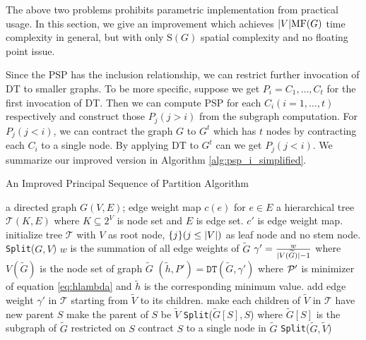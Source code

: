 \documentclass[runningheads]{llncs}
\begin{document}
The above two problems prohibits parametric implementation from practical usage. In this section, we give an improvement which achieves $\abs{V} \textrm{MF}(G)$ time complexity in general, but with only $\textrm{S}(G)$ spatial complexity and no floating point issue.

Since the PSP has the inclusion relationship, we can restrict further invocation of DT to smaller graphs. To be more specific, suppose we get $P_i = {C_1, \dots, C_t}$ for the first invocation of DT. Then we can compute PSP for each $C_i(i=1,\dots, t)$ respectively and construct those $P_j(j>i)$ from the subgraph computation. For $P_j(j<i)$, we can contract the graph $G$  to $G^t$ which has $t$ nodes by contracting each $C_i$ to a single node. By applying DT to $G^t$ can we get $P_j(j<i)$. We summarize our improved version in Algorithm \ref{alg:psp_i_simplified}.

\begin{algorithm}
	\caption{An Improved Principal Sequence of Partition Algorithm}\label{alg:psp_i_simplified}
	\begin{algorithmic}[1]
		\REQUIRE a directed graph $G(V, E)$; edge weight map $c(e)$ for $e\in E$
		\ENSURE a hierarchical tree $\mathcal{T}(K, E)$ where $K \subseteq 2^{V}$ is node set and $E$ is edge set. $c'$ is edge weight map.
		\STATE initialize tree $\mathcal{T}$ with $V$ as root node, $\{j\}(j\leq \abs{V})$ as leaf node and no stem node.
		\STATE \texttt{Split}($G, V$)
		\STATE $w$ is the summation of all edge weights of $\widetilde{G}$ 
		\STATE $\gamma' = \frac{w}{\abs{V(\widetilde{G})}-1}$ where $V(\widetilde{G})$ is the node set of graph $\widetilde{G}$ \label{alg:gamma_apostrophe}
		\STATE $(\tilde{h}, P') = \texttt{DT}(\widetilde{G}, \gamma')$ where $\P'$ is minimizer of equation \eqref{eq:hlambda} and $\tilde{h}$ is the corresponding minimum value.  \label{alg:DT}
		\STATE add edge weight $\gamma'$ in $\mathcal{T}$ starting from $\widetilde{V}$ to its children.
		\ELSE
		\STATE make each children of $\widetilde{V}$ in $\mathcal{T}$ have new parent $S$		
		\STATE make the parent of $S$ be $\widetilde{V}$
		\STATE \texttt{Split}($\widetilde{G}[S], S$) where $\widetilde{G}[S]$ is the subgraph of $\widetilde{G}$ restricted on $S$
		\STATE contract $S$ to a single node in $\widetilde{G}$ %
		\ENDFOR 
		\STATE \texttt{Split}($\widetilde{G}, \widetilde{V}$)		
		\ENDIF
		\ENDFUNCTION
	\end{algorithmic}
\end{algorithm}
	
\end{document}
